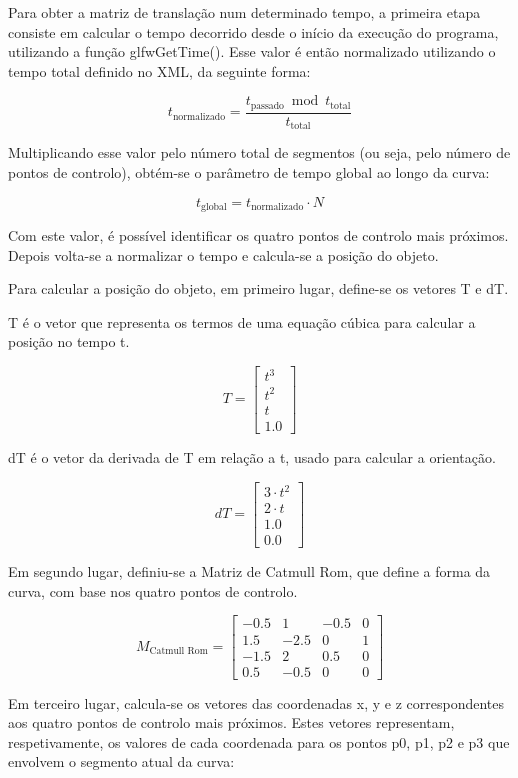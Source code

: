 \documentclass[12pt, a4paper]{article}
\begin{document}
Para obter a matriz de translação num determinado tempo,
a primeira etapa consiste em calcular o tempo decorrido desde o início da execução
do programa, utilizando a função glfwGetTime().
Esse valor é então normalizado utilizando o tempo total definido no XML, da seguinte forma:

\[
t_{\text{normalizado}} = \frac{t_{\text{passado}} \bmod t_{\text{total}}}{t_{\text{total}}}
\]

Multiplicando esse valor pelo número total de segmentos (ou seja, pelo número de
pontos de controlo), obtém-se o parâmetro de tempo global ao longo da curva:

\[
t_{\text{global}} = t_{\text{normalizado}} \cdot N
\]

Com este valor, é possível identificar os quatro pontos de controlo mais próximos.
Depois volta-se a normalizar o tempo e calcula-se a posição do objeto.

Para calcular a posição do objeto, em primeiro lugar, define-se os vetores T e dT.

T é o vetor que representa os termos de uma equação cúbica para calcular a posição no tempo t.

$$
T = \begin{bmatrix} t^3 \\ t^2 \\ t \\ 1.0 \end{bmatrix}
$$

dT é o vetor da derivada de T em relação a t, usado para calcular a orientação.

$$
dT = \begin{bmatrix} 3 \cdot t^2 \\ 2 \cdot t \\ 1.0 \\ 0.0 \end{bmatrix}
$$

Em segundo lugar, definiu-se a Matriz de Catmull Rom, que define a forma da curva,
com base nos quatro pontos de controlo.

$$
M_{\text{Catmull Rom}} =
\begin{bmatrix}
    -0.5 & 1   & -0.5 & 0 \\
    1.5  & -2.5 & 0    & 1 \\
    -1.5 & 2   & 0.5  & 0 \\
    0.5  & -0.5 & 0    & 0
\end{bmatrix}
$$

Em terceiro lugar, calcula-se os vetores das coordenadas x, y e z correspondentes
aos quatro pontos de controlo mais próximos. Estes vetores representam, respetivamente,
os valores de cada coordenada para os pontos p0, p1, p2 e p3 que envolvem o
segmento atual da curva:
\end{document}
